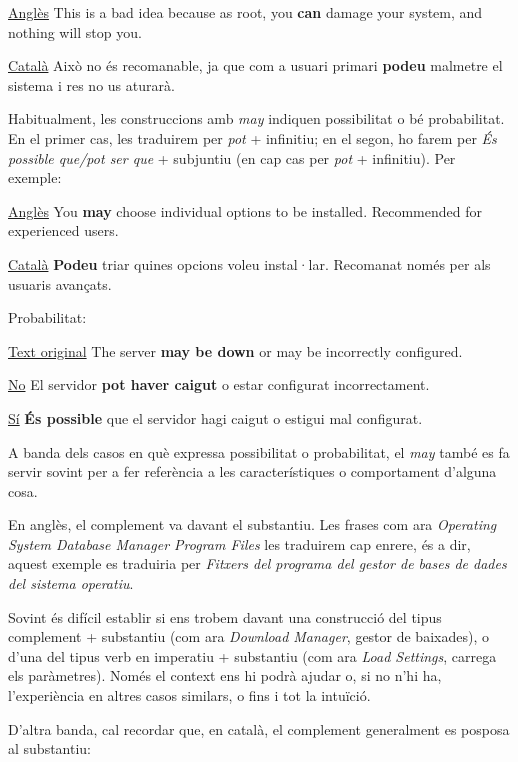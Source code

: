 \documentclass[9pt]{cheatsheet}
\begin{document}
\begin{multicols*}{3}
\underline {Anglès} This is a bad idea because as root, you \textbf{can} damage your system, and nothing will stop you.

\underline {Català} Això no és recomanable, ja que com a usuari primari \textbf{podeu} malmetre el sistema i res no us aturarà.



Habitualment, les construccions amb \emph{may} indiquen possibilitat o bé probabilitat. En el primer cas, les traduirem per \emph{pot} + infinitiu; en el segon, ho farem per \emph{És possible que/pot ser que} + subjuntiu (en cap cas per \emph{pot} + infinitiu). Per exemple:

\underline {Anglès} You \textbf{may} choose individual options to be installed. Recommended for experienced users.

\underline {Català} \textbf{Podeu} triar quines opcions voleu instal·lar. Recomanat només per als usuaris avançats.

Probabilitat:

\underline {Text original} The server \textbf{may be down} or may be incorrectly configured.

\underline {No} El servidor \textbf{pot haver caigut} o estar configurat incorrectament.

\underline {Sí} \textbf{És possible} que el servidor hagi caigut o estigui mal configurat.

A banda dels casos en què expressa possibilitat o probabilitat, el \emph{may} també es fa servir sovint per a fer referència a les característiques o comportament d'alguna cosa.


En anglès, el complement va davant el substantiu. Les frases com ara \emph{Operating System Database Manager Program Files} les traduirem cap enrere, és a dir, aquest exemple es traduiria per \emph{Fitxers del programa del gestor de bases de dades del sistema operatiu}.

Sovint és difícil establir si ens trobem davant una construcció del tipus complement + substantiu (com ara \emph{Download Manager}, gestor de baixades), o d'una del tipus verb en imperatiu + substantiu (com ara \emph{Load Settings}, carrega els paràmetres). Només el context ens hi podrà ajudar o, si no n'hi ha, l'experiència en altres casos similars, o fins i tot la intuïció.

D'altra banda, cal recordar que, en català, el complement generalment es posposa al substantiu:


\end{multicols*}
\end{document}
